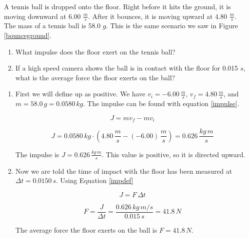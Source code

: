 \documentclass[12pt]{book}
\begin{document}
\begin{exampleblock}

A tennis ball is dropped onto the floor. Right before it hits the ground, it is moving downward at 6.00 $\frac{m}{s}$. After it bounces, it is moving upward at 4.80 $\frac{m}{s}$. The mass of a tennis ball is 58.0 $g$. This is the same scenario we saw in Figure \ref{bounceground}.


\begin{enumerate}
\item What impulse does the floor exert on the tennis ball?
\item If a high speed camera shows the ball is in contact with the floor for 0.015 $s$, what is the average force the floor exerts on the ball?
\end{enumerate}

\hspace{10pt}

\begin{enumerate}
\item First we will define up as positive. We have $v_i = -6.00 \, \frac{m}{s}$, $v_f = 4.80 \, \frac{m}{s}$, and $m = 58.0 \, g = 0.0580 \, kg$. The impulse can be found with equation \ref{impulse}.

\begin{equation}
J = m v_f - m v_i 
\end{equation}

\begin{equation}
J = 0.0580 \, kg \cdot (4.80 \, \frac{m}{s} - (-6.00) \, \frac{m}{s}) = 0.626 \, \frac{kg \, m}{s}
\end{equation}

The impulse is $J = 0.626 \, \frac{kg \, m}{s}$. This value is positive, so it is directed upward.

\item Now we are told the time of impact with the floor has been measured at $\Delta t = 0.0150 \, s$. Using Equation \ref{impdef}

\begin{equation}
J = F \, \Delta t
\end{equation}

\begin{equation}
F = \frac{J}{\Delta t} = \frac{0.626 \, kg \, m/s}{0.015 \, s} = 41.8 \, N
\end{equation}

The average force the floor exerts on the ball is $F = 41.8 \, N$.
\end{enumerate}

\end{exampleblock}
\end{document}
